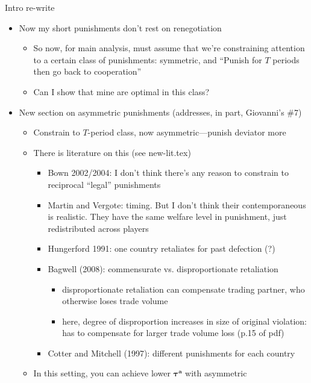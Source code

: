 \documentclass[12pt]{article}
\newcommand{\bta}{\bm{\tau^a}}
\begin{document}
\newpage
Intro re-write
\begin{itemize}	
	\item Now my short punishments don't rest on renegotiation
		\begin{itemize}
			\item So now, for main analysis, must assume that we're constraining attention to a certain class of punishments: symmetric, and ``Punish for $T$ periods then go back to cooperation''
			\item Can I show that mine are optimal in this class?
		\end{itemize}
	
	\item New section on asymmetric punishments (addresses, in part, Giovanni's $\#$7)
		\begin{itemize}
			\item Constrain to $T$-period class, now asymmetric---punish deviator more
			\item There is literature on this (see new-lit.tex)
				\begin{itemize}
					\item Bown 2002/2004: I don't think there's any reason to constrain to reciprocal ``legal'' punishments
					\item Martin and Vergote: timing. But I don't think their contemporaneous is realistic. They have the same welfare level in punishment, just redistributed across players
					\item Hungerford 1991: one country retaliates for past defection (?)
					\item Bagwell (2008): commensurate vs. disproportionate retaliation
						\begin{itemize}
							\item disproportionate retaliation can compensate trading partner, who otherwise loses trade volume
							\item here, degree of disproportion increases in size of original violation: has to compensate for larger trade volume loss (p.15 of pdf)
						\end{itemize}
					\item Cotter and Mitchell (1997): different punishments for each country
				\end{itemize}
			\item In this setting, you can achieve lower $\bta$ with asymmetric
		\end{itemize}
	

\end{itemize}
\end{document}
